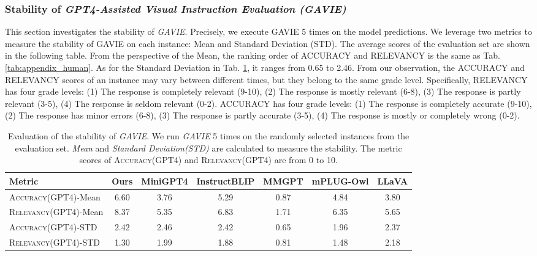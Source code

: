 \subsubsection{Stability of \textit{GPT4-Assisted Visual Instruction Evaluation (GAVIE)}}
This section investigates the stability of \textit{GAVIE}. Precisely, we execute GAVIE 5 times on the model predictions. We leverage two metrics to measure the stability of GAVIE on each instance: Mean and Standard Deviation (STD). The average scores of the evaluation set are shown in the following table. From the perspective of the Mean, the ranking order of ACCURACY and RELEVANCY is the same as Tab. \ref{tab:appendix_human}. As for the Standard Deviation in Tab. \ref{tab:stability1}, it ranges from 0.65 to 2.46. From our observation, the ACCURACY and RELEVANCY scores of an instance may vary between different times, but they belong to the same grade level. Specifically, RELEVANCY has four grade levels: (1) The response is completely relevant (9-10), (2) The response is mostly relevant (6-8), (3) The response is partly relevant (3-5), (4) The response is seldom relevant (0-2). ACCURACY has four grade levels: (1) The response is completely accurate (9-10), (2) The response has minor errors (6-8), (3) The response is partly accurate (3-5), (4) The response is mostly or completely wrong (0-2).

\begin{table}[h]
\setlength\tabcolsep{3pt}
\centering
\small
\begin{tabular}{lcccccc}
\toprule[1.5pt]
Metric& Ours & MiniGPT4 & InstructBLIP & MMGPT& mPLUG-Owl & LLaVA\\
\midrule
\textsc{Accuracy(GPT4)}-Mean&6.60&3.76&5.29&0.87&4.84&3.80\\
\textsc{Relevancy(GPT4)}-Mean&8.37&5.35&6.83&1.71&6.35&5.65\\
\midrule
\textsc{Accuracy(GPT4)}-STD&2.42&2.46&2.42&0.65&1.96&2.37\\
\textsc{Relevancy(GPT4)}-STD&1.30&1.99&1.88&0.81&1.48&2.18\\
\bottomrule
\end{tabular}
\vspace{0.06in}
\caption{Evaluation of the stability of \textit{GAVIE}. We run \textit{GAVIE} 5 times on the randomly selected instances from the evaluation set. \textit{Mean} and \textit{Standard Deviation(STD)} are calculated to measure the stability. The metric scores of \textsc{Accuracy(GPT4)} and \textsc{Relevancy(GPT4)} are from 0 to 10.
}
\label{tab:stability1}
\vspace{-0.2in}
\end{table}

